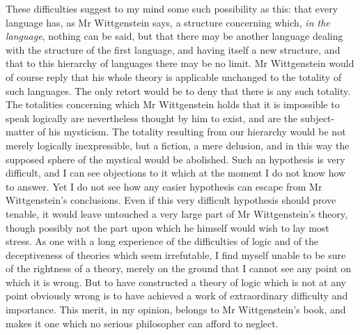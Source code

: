 These difficulties suggest to my mind some such
possibility as this: that every language has, as Mr
Wittgenstein says, a structure concerning which, \emph{in the
language}, nothing can be said, but that there may be
another language dealing with the structure of the first
language, and having itself a new structure, and that to
this hierarchy of languages there may be no limit. Mr
Wittgenstein would of course reply that his whole theory
is applicable unchanged to the totality of such languages.
The only retort would be to deny that there is any such
totality. The totalities concerning which Mr Wittgenstein
holds that it is impossible to speak logically are nevertheless
thought by him to exist, and are the subject-matter of his
mysticism. The totality resulting from our hierarchy
would be not merely logically inexpressible, but a fiction,
a mere delusion, and in this way the supposed sphere of
the mystical would be abolished. Such an hypothesis is
very difficult, and I can see objections to it which at the
moment I do not know how to answer. Yet I do not
see how any easier hypothesis can escape from Mr
Wittgenstein's conclusions. Even if this very difficult
hypothesis should prove tenable, it would leave untouched
a very large part of Mr Wittgenstein's theory, though
possibly not the part upon which he himself would wish
to lay most stress. As one with a long experience of the
difficulties of logic and of the deceptiveness of theories
which seem irrefutable, I find myself unable to be sure
of the rightness of a theory, merely on the ground that I
cannot see any point on which it is wrong. But to have
constructed a theory of logic which is not at any point
obviously wrong is to have achieved a work of extraordinary
difficulty and importance. This merit, in my
opinion, belongs to Mr Wittgenstein's book, and makes
it one which no serious philosopher can afford to neglect.